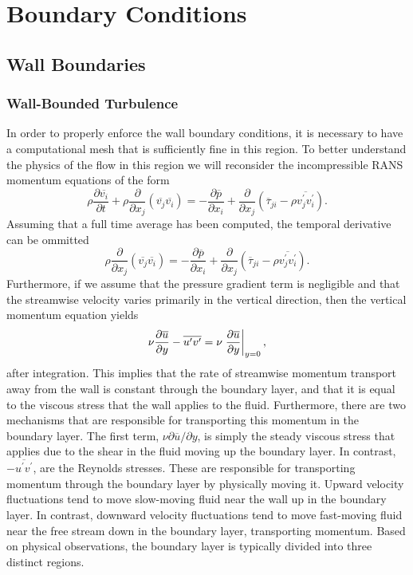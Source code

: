 \chapter{Boundary Conditions}
\section{Wall Boundaries}
\subsection{Wall-Bounded Turbulence}
In order to properly enforce the wall boundary conditions, it is necessary to have a computational mesh that is sufficiently fine in this region. To better understand the physics of the flow in this region we will reconsider the incompressible RANS momentum equations of the form
\begin{equation}
    \rho \frac{\partial \overline{v_i}}{\partial t} 
    + \rho  \frac{\partial}{\partial x_j} \left(\overline{v_j}\overline{v_i}\right)
    =- \frac{\partial \overline{p}}{\partial x_i} 
    + \frac{\partial}{\partial x_j} \left(\overline\tau_{ji} - \rho \overline{v_j^\prime v_i^\prime}\right).
\end{equation}
Assuming that a full time average has been computed, the temporal derivative can be ommitted
\begin{equation}
    \rho  \frac{\partial}{\partial x_j} \left(\overline{v_j}\overline{v_i}\right)
    =- \frac{\partial \overline{p}}{\partial x_i} 
    + \frac{\partial}{\partial x_j} \left(\overline\tau_{ji} - \rho \overline{v_j^\prime v_i^\prime}\right).
\end{equation}
Furthermore, if we assume that the pressure gradient term is negligible and that the streamwise velocity varies primarily in the vertical direction, then the vertical momentum equation yields
\begin{equation}
	\label{eqn:3nsi2039}
	\nu \frac{\partial \overline{u}}{\partial y} - \overline{u^\prime v^\prime} = \nu \left.\frac{\partial \overline{u}}{\partial y}\right\rvert_{y=0}^{},
\end{equation}
after integration. This implies that the rate of streamwise momentum transport away from the wall is constant through the boundary layer, and that it is equal to the viscous stress that the wall applies to the fluid. Furthermore, there are two mechanisms that are responsible for transporting this momentum in the boundary layer. The first term, $\nu \partial \overline{u}/\partial y$, is simply the steady viscous stress that applies due to the shear in the fluid moving up the boundary layer. In contrast, $-\overline{u^\prime v^\prime}$, are the Reynolds stresses. These are responsible for transporting momentum through the boundary layer by physically moving it. Upward velocity fluctuations tend to move slow-moving fluid near the wall up in the boundary layer. In contrast, downward velocity fluctuations tend to move fast-moving fluid near the free stream down in the boundary layer, transporting momentum. Based on physical observations, the boundary layer is typically divided into three distinct regions.
